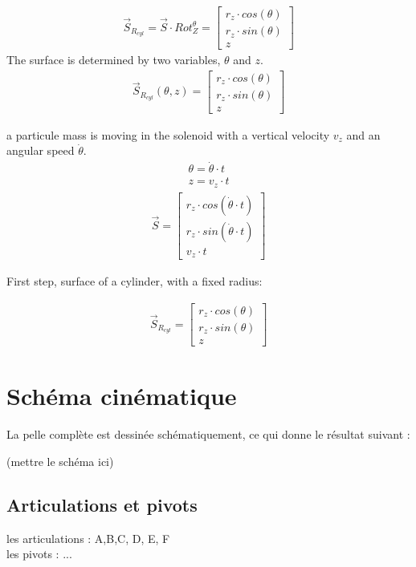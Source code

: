 \documentclass[12pt,a4paper]{article}
\begin{document}
\begin{eqnarray}
\vec{S}_{R_{cyl}}=\vec{S}\cdot Rot_Z^{\theta}=\begin{bmatrix}
r_z \cdot cos(\theta) \\
r_z \cdot sin(\theta) \\
z
\end{bmatrix}
\end{eqnarray}
The surface is determined by two variables, $\theta$ and $z$.
\begin{eqnarray}
\vec{S}_{R_{cyl}}(\theta,z)=\begin{bmatrix}
r_z \cdot cos(\theta) \\
r_z \cdot sin(\theta) \\
z
\end{bmatrix}
\end{eqnarray}



a particule mass is moving in the solenoid with a vertical velocity $v_z$ and an angular speed $\dot{\theta}$.
\begin{eqnarray}
\theta = \dot{\theta} \cdot t\\
z = v_z \cdot t
\end{eqnarray}
\begin{eqnarray}
\vec{S}=\begin{bmatrix}
r_z \cdot cos(\dot{\theta} \cdot t) \\
r_z \cdot sin(\dot{\theta} \cdot t) \\
v_z \cdot t
\end{bmatrix}
\end{eqnarray}




First step, surface of a cylinder, with a fixed radius: 

\begin{eqnarray}
\vec{S}_{R_{cyl}}=\begin{bmatrix}
r_z \cdot cos(\theta) \\
r_z \cdot sin(\theta) \\
z
\end{bmatrix}
\end{eqnarray}
\newpage
\section{Schéma cinématique}
La pelle complète est dessinée schématiquement, ce qui donne le résultat suivant : 

(mettre le schéma ici)
\subsection{Articulations et pivots}
les articulations : A,B,C, D, E, F\\
les pivots : ...\\
\end{document}
